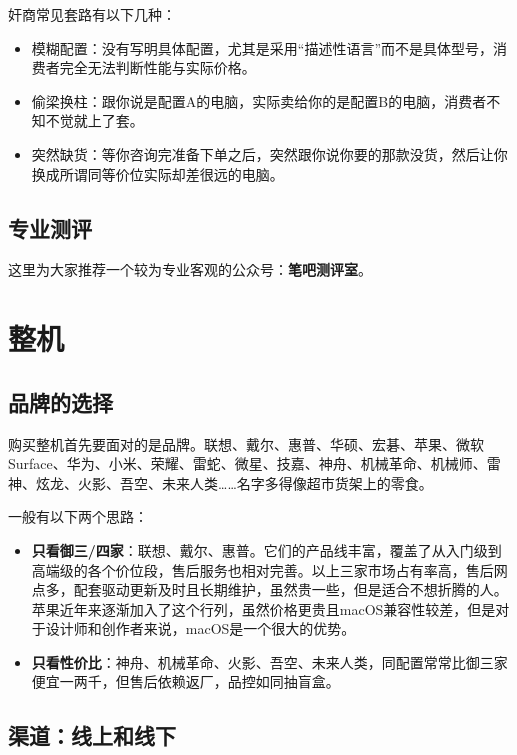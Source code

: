 \documentclass[../main.tex]{subfiles}
\begin{document}
奸商常见套路有以下几种：
\begin{itemize}
    \item 模糊配置：没有写明具体配置，尤其是采用“描述性语言”而不是具体型号，消费者完全无法判断性能与实际价格。
    \item 偷梁换柱：跟你说是配置A的电脑，实际卖给你的是配置B的电脑，消费者不知不觉就上了套。
    \item 突然缺货：等你咨询完准备下单之后，突然跟你说你要的那款没货，然后让你换成所谓同等价位实际却差很远的电脑。
\end{itemize}

\subsection{专业测评}

这里为大家推荐一个较为专业客观的公众号：\textbf{笔吧测评室}。

\section{整机}

\subsection{品牌的选择}

购买整机首先要面对的是品牌。联想、戴尔、惠普、华硕、宏碁、苹果、微软 Surface、华为、小米、荣耀、雷蛇、微星、技嘉、神舟、机械革命、机械师、雷神、炫龙、火影、吾空、未来人类……名字多得像超市货架上的零食。

一般有以下两个思路：

\begin{itemize}
    \item \textbf{只看御三/四家}：联想、戴尔、惠普。它们的产品线丰富，覆盖了从入门级到高端级的各个价位段，售后服务也相对完善。以上三家市场占有率高，售后网点多，配套驱动更新及时且长期维护，虽然贵一些，但是适合不想折腾的人。苹果近年来逐渐加入了这个行列，虽然价格更贵且macOS兼容性较差，但是对于设计师和创作者来说，macOS是一个很大的优势。
    \item \textbf{只看性价比}：神舟、机械革命、火影、吾空、未来人类，同配置常常比御三家便宜一两千，但售后依赖返厂，品控如同抽盲盒。
\end{itemize}

\subsection{渠道：线上和线下}
\end{document}
